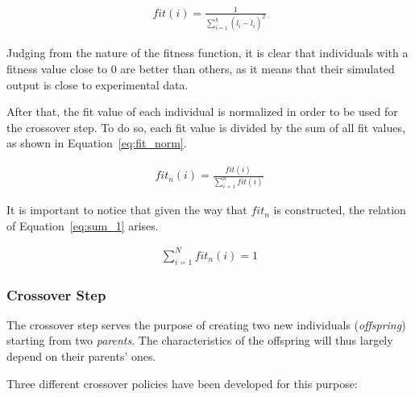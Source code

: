 \begin{align}
fit(i) = \frac{1}{\sum_{i=1}^k{\left(l_i-\hat{l}_i\right)^2}}
\label{eq:fitness}
\end{align}

Judging from the nature of the fitness function, it is clear that
individuals with a fitness value close to 0 are better than others,
as it means that their simulated output is close to experimental data.

After that, the fit value of each individual is normalized in order to be used
for the crossover step. To do so, each fit value is divided by the sum of all fit values,
as shown in Equation~\ref{eq:fit_norm}.

\begin{align}
fit_n(i) = \frac{fit(i)}{\sum_{i=1}^n fit(i)}
\label{eq:fit_norm}
\end{align}

It is important to notice that given the way that $fit_n$ is constructed,
the relation of Equation~\ref{eq:sum_1} arises.

\begin{align}
\sum_{i=1}^N fit_n(i) = 1
\label{eq:sum_1}
\end{align}

\subsubsection{Crossover Step}

The crossover step serves the purpose of creating two new individuals (\textit{offspring})
starting from two \textit{parents}. The characteristics of the offspring will thus
largely depend on their parents' ones.

Three different crossover policies have been developed for this purpose:


